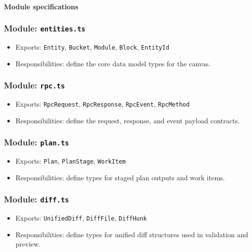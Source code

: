 \documentclass[11pt]{article}
\begin{document}
\paragraph{Module specifications}
\subsubsection*{Module: \texttt{entities.ts}}
\begin{itemize}[noitemsep]
  \item Exports: \texttt{Entity}, \texttt{Bucket}, \texttt{Module}, \texttt{Block}, \texttt{EntityId}
  \item Responsibilities: define the core data model types for the canvas.
\end{itemize}

\subsubsection*{Module: \texttt{rpc.ts}}
\begin{itemize}[noitemsep]
  \item Exports: \texttt{RpcRequest}, \texttt{RpcResponse}, \texttt{RpcEvent}, \texttt{RpcMethod}
  \item Responsibilities: define the request, response, and event payload contracts.
\end{itemize}

\subsubsection*{Module: \texttt{plan.ts}}
\begin{itemize}[noitemsep]
  \item Exports: \texttt{Plan}, \texttt{PlanStage}, \texttt{WorkItem}
  \item Responsibilities: define types for staged plan outputs and work items.
\end{itemize}

\subsubsection*{Module: \texttt{diff.ts}}
\begin{itemize}[noitemsep]
  \item Exports: \texttt{UnifiedDiff}, \texttt{DiffFile}, \texttt{DiffHunk}
  \item Responsibilities: define types for unified diff structures used in validation and preview.
\end{itemize}
\end{document}
